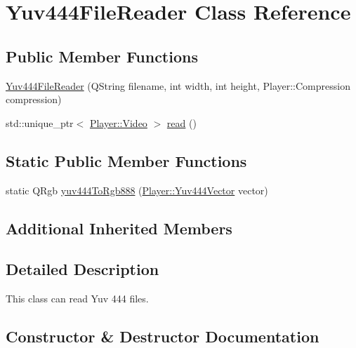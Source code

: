 \hypertarget{classPlayer_1_1Yuv444FileReader}{}\section{Yuv444\+File\+Reader Class Reference}
\label{classPlayer_1_1Yuv444FileReader}
\subsection*{Public Member Functions}
\begin{DoxyCompactItemize}
\item 
\hyperlink{classPlayer_1_1Yuv444FileReader_a0b36c0b768304cd51c1893277ef6364a}{Yuv444\+File\+Reader} (Q\+String filename, int width, int height, Player\+::\+Compression compression)
\item 
std\+::unique\+\_\+ptr$<$ \hyperlink{classPlayer_1_1Video}{Player\+::\+Video} $>$ \hyperlink{classPlayer_1_1Yuv444FileReader_aa4ccefe92119bf1d8879e9e219af8f93}{read} ()
\end{DoxyCompactItemize}
\subsection*{Static Public Member Functions}
\begin{DoxyCompactItemize}
\item 
static Q\+Rgb \hyperlink{classPlayer_1_1Yuv444FileReader_a0e728595d302c3f082d83e26a8ffc071}{yuv444\+To\+Rgb888} (\hyperlink{classPlayer_1_1Yuv444Vector}{Player\+::\+Yuv444\+Vector} vector)
\end{DoxyCompactItemize}
\subsection*{Additional Inherited Members}


\subsection{Detailed Description}
This class can read Yuv 444 files. 

\subsection{Constructor \& Destructor Documentation}
\hypertarget{classPlayer_1_1Yuv444FileReader_a0b36c0b768304cd51c1893277ef6364a}{}
